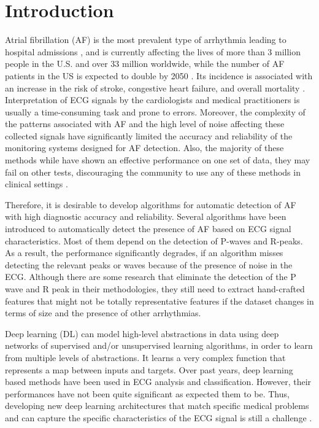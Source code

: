 \documentclass[conference]{IEEEtran}
\begin{document}
\section{Introduction}
Atrial fibrillation (AF) is the most prevalent type of arrhythmia leading to hospital admissions \cite{elmoaqet2017new}, and is currently affecting the lives of more than 3 million people in the U.S. and over 33 million worldwide, while the number of AF patients in the US is expected to double by 2050 \cite{AF_2020}. Its incidence is associated with an increase in the risk of stroke, congestive heart failure, and overall mortality \cite{hamid4,hamid3}. Interpretation of ECG signals by the cardiologists and medical practitioners is usually a time-consuming task and prone to errors. Moreover, the complexity of the patterns associated with AF and the high level of noise affecting these collected signals have significantly limited the accuracy and reliability of the monitoring systems designed for AF detection.
Also, the majority of these methods while have shown an effective performance on one set of data,  they may fail on other tests, discouraging the community to use any of these methods in clinical settings \cite{Ross,zaeri2018feature,afghah2015game}. 

Therefore, it is desirable to develop algorithms for automatic detection
of AF with high diagnostic accuracy and reliability. Several algorithms have been introduced to automatically detect the presence of AF based on ECG signal characteristics. Most of them depend on the detection of P-waves and R-peaks. As a result, the performance significantly degrades, if an algorithm misses detecting the relevant peaks or waves because of the presence of noise in the ECG. Although there are some research \cite{asgari2015automatic,de2006patient} that eliminate the detection of the P wave and R peak in their methodologies, they still need to extract hand-crafted features that might not be totally representative features if the dataset changes in terms of size and the presence of other arrhythmias.   

Deep learning (DL) can model high-level abstractions in data using deep networks of supervised and/or unsupervised learning algorithms, in order to learn from multiple levels of abstractions. It learns a very complex function that represents a map between inputs and targets. Over past years, deep learning based methods have been used in ECG analysis and classification. However, their performances have not been quite significant as expected them to be. Thus, developing new deep learning architectures that match specific medical problems and can capture the specific characteristics of the ECG signal is still a challenge \cite{mousavi2018inter}. 
\end{document}
